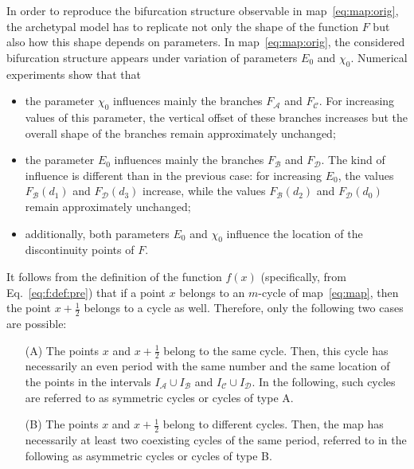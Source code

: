 \documentclass[10pt]{article}
\newcommand{\A}{{\mathcal A}}
\newcommand{\B}{{\mathcal B}}
\newcommand{\C}{{\mathcal C}}
\newcommand{\D}{{\mathcal D}}
\newcommand{\FA}{F_\A}
\newcommand{\FB}{F_\B}
\newcommand{\FC}{F_\C}
\newcommand{\FD}{F_\D}
\begin{document}
In order to reproduce the bifurcation structure observable in
map~\eqref{eq:map:orig}, the archetypal model has to replicate not
only the shape of the function $F$ but also how this shape depends on
parameters.  In map~\eqref{eq:map:orig}, the considered bifurcation
structure appears under variation of parameters $E_0$ and $\chi_0$.
Numerical experiments show that that
\begin{itemize}
	\item the parameter $\chi_0$ influences mainly the branches $\FA$ and
	      $\FC$. For increasing values of this parameter,
	      the vertical offset of these branches increases but the overall
	      shape of the branches remain approximately unchanged;
	\item the parameter $E_0$ influences mainly the branches $\FB$ and
	      $\FD$. The kind of influence is different than in the previous
	      case: for increasing $E_0$, the values $\FB(d_1)$ and $\FD(d_3)$
	      increase, while the values $\FB(d_2)$ and $\FD(d_0)$ remain
	      approximately unchanged;
	\item additionally, both parameters $E_0$ and $\chi_0$ influence the location
	      of the discontinuity points of $F$.
\end{itemize}

\dotfill

It follows from the definition of the function $f(x)$ (specifically,
from Eq.~\eqref{eq:f:def:pre}) that if a point $x$ belongs to an
$m$-cycle of map~\eqref{eq:map}, then the point $x+\frac{1}{2}$
belongs to a cycle as well. Therefore, only the following two
cases are possible:
\begin{itemize}
	\item[(A)] The points $x$ and $x+\frac{1}{2}$ belong to the same
		cycle.  Then, this cycle has necessarily an even period with the
		same number and the same location of the points in the intervals
		$I_\A \cup I_\B$ and $I_\C \cup I_\D$.  In the
		following, such cycles are referred to as symmetric cycles or
		cycles of type A.
	\item[(B)] The points $x$ and $x+\frac{1}{2}$ belong to different cycles.
		Then, the map has necessarily at least two coexisting cycles
		of the same period, referred to in the following as asymmetric cycles
		or cycles of type B.
\end{itemize}
\end{document}
